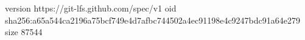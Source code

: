version https://git-lfs.github.com/spec/v1
oid sha256:a65a544ca2196a75bcf749e4d7afbc744502a4ec91198e4c9247bdc91a64e279
size 87544
